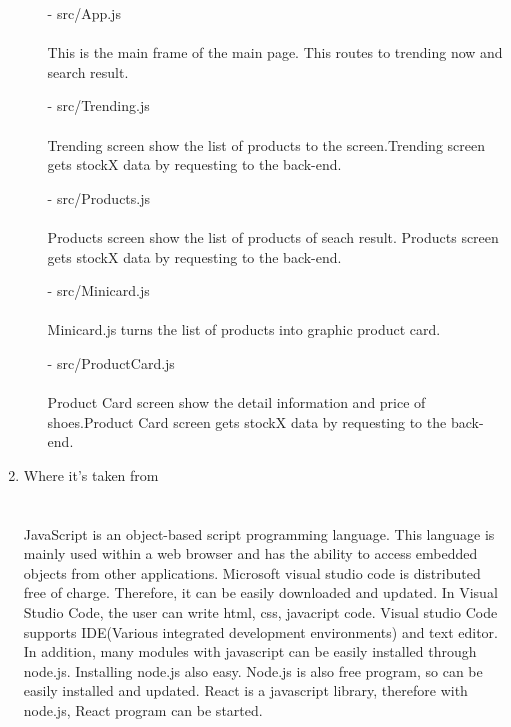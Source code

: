 \documentclass[conference]{IEEEtran}
\begin{document}
\begin{enumerate}
	\begin{enumerate}
		\item[-] src/App.js\\\\
		This is the main frame of the main page. This routes to trending now and search result.\\
	\end{enumerate}
	\begin{enumerate}
		\item[-] src/Trending.js\\\\
		Trending screen show the list of products to the screen.Trending screen gets stockX data by requesting to the back-end.\\
	\end{enumerate}
	\begin{enumerate}
		\item[-] src/Products.js\\\\
		Products screen show the list of products of seach result. Products screen gets stockX data by requesting to the back-end.\\
	\end{enumerate}
	\begin{enumerate}
		\item[-] src/Minicard.js\\\\
		Minicard.js turns the list of products into graphic product card.\\
	\end{enumerate}
	\begin{enumerate}
		\item[-] src/ProductCard.js\\\\
		Product Card screen show the detail information and price of shoes.Product Card screen gets stockX data by requesting to the back-end. \\
	\end{enumerate}
\item Where it's taken from\\
\\\\JavaScript is an object-based script programming language. This language is mainly used within a web browser and has the ability to access embedded objects from other applications. Microsoft visual studio code is distributed free of charge. Therefore, it can be easily downloaded and updated. In Visual Studio Code, the user can write html, css, javacript code. Visual studio Code supports IDE(Various integrated development environments) and text editor. In addition, many modules with javascript can be easily installed through node.js. Installing node.js also easy. Node.js is also free program, so can be easily installed and updated. React is a javascript library, therefore with node.js, React program can be started.\\\\

\end{enumerate}
\end{document}

